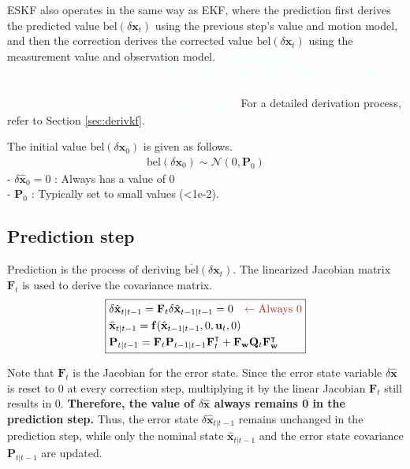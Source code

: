 \documentclass[10pt]{article}
\newcommand{\textbfazure}[1]{\textcolor{azure}{\textbf{#1}}}
\begin{document}
	ESKF also operates in the same way as EKF, where the prediction first derives the predicted value $\overline{\text{bel}}(\delta \mathbf{x}_{t})$ using the previous step's value and motion model, and then the correction derives the corrected value $\text{bel}(\delta \mathbf{x}_{t})$ using the measurement value and observation model. \textbfazure{Substituting $p(\delta \mathbf{x}_{t} | \delta \mathbf{x}_{t-1}, \mathbf{u}_{t}), p(\mathbf{z}_{t} | \delta \mathbf{x}_{t})$ into the above formula allows you to derive the mean and covariance for the prediction and correction steps, $(\delta \hat{\mathbf{x}}_{t|t-1}, \mathbf{P}_{t|t-1}), (\delta \hat{\mathbf{x}}_{t|t}, \mathbf{P}_{t|t})$, respectively.} For a detailed derivation process, refer to Section \ref{sec:derivkf}.
	
	
	The initial value $\text{bel}(\delta \mathbf{x}_{0})$ is given as follows.
	\begin{equation}
	\begin{aligned}
		\text{bel}(\delta \mathbf{x}_{0}) \sim \mathcal{N}(0, \mathbf{P}_{0})
	\end{aligned}
	\end{equation}
	- $\delta \hat{\mathbf{x}}_{0} = 0$ : Always has a value of 0\\
	- $\mathbf{P}_{0}$ : Typically set to small values (<1e-2).
	
	
	
	\subsection{Prediction step}
	Prediction is the process of deriving $\overline{\text{bel}}(\delta \mathbf{x}_{t})$. The linearized Jacobian matrix $\mathbf{F}_{t}$ is used to derive the covariance matrix.
	\begin{equation} \label{eq:eskf-pred}
	\boxed{  \begin{aligned}
			& \delta \hat{\mathbf{x}}_{t|t-1} = \mathbf{F}_{t}\delta \hat{\mathbf{x}}_{t-1|t-1} = 0 {\color{Mahogany} \quad \leftarrow \text{Always 0} } \\
			& \hat{\mathbf{x}}_{t|t-1} = \mathbf{f}(\hat{\mathbf{x}}_{t-1|t-1}, 0,\mathbf{u}_{t}, 0) \\ 
			& \mathbf{P}_{t|t-1} = \mathbf{F}_{t}\mathbf{P}_{t-1|t-1}\mathbf{F}_{t}^{\intercal} + \mathbf{F}_{\mathbf{w}}\mathbf{Q}_{t}  \mathbf{F}_{\mathbf{w}}^{\intercal}
	\end{aligned} }
	\end{equation}
	
	Note that $\mathbf{F}_{t}$ is the Jacobian for the error state. Since the error state variable $\delta \hat{\mathbf{x}}$ is reset to 0 at every correction step, multiplying it by the linear Jacobian $\mathbf{F}_{t}$ still results in 0. \textbf{Therefore, the value of $\delta \hat{\mathbf{x}}$ always remains 0 in the prediction step.} Thus, the error state $\delta \hat{\mathbf{x}}_{t|t-1}$ remains unchanged in the prediction step, while only the nominal state $\hat{\mathbf{x}}_{t|t-1}$ and the error state covariance $\mathbf{P}_{t|t-1}$ are updated.
	
\end{document}
